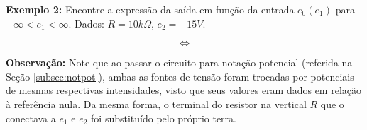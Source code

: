 \documentclass{article}
\numberwithin{equation}{section}
\newlength\Colsep
\begin{document}
\textbf{Exemplo 2:} Encontre a expressão da saída em função da entrada $e_0(e_1)$ para $-\infty < e_1 < \infty$. Dados: $R=10k\Omega$, $e_2=-15V$.

\begin{center}
\noindent\begin{minipage}{\textwidth}
\begin{minipage}[c][5cm][c]{\dimexpr0.45\textwidth-0.5\Colsep\relax}
    \begin{center}
\end{center}
\end{minipage} \hfill
\begin{minipage}[c][5cm][c]{\dimexpr0.1\textwidth-0.5\Colsep\relax}
    $$\iff$$
\end{minipage} \hfill
\begin{minipage}[c][5cm][c]{\dimexpr0.45\textwidth-0.5\Colsep\relax}
    \begin{center}
\end{center}
\end{minipage}
\end{minipage}
\end{center}

\textbf{Observação:} Note que ao passar o circuito para notação potencial (referida na Seção \ref{subsec:notpot}), ambas as fontes de tensão foram trocadas por potenciais de mesmas respectivas intensidades, visto que seus valores eram dados em relação à referência nula. Da mesma forma, o terminal do resistor na vertical $R$ que o conectava a $e_1$ e $e_2$ foi substituído pelo próprio terra.
\end{document}
